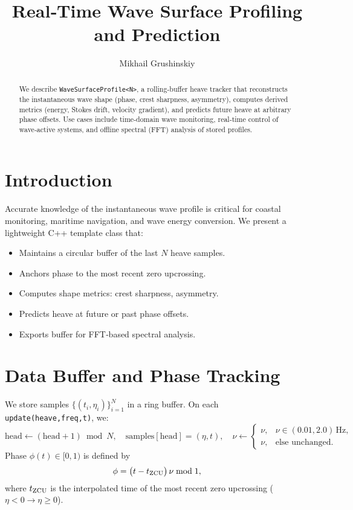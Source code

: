 \documentclass[11pt]{article}
\title{Real‐Time Wave Surface Profiling and Prediction}
\author{Mikhail Grushinskiy}
\affil{Independent Researcher, 2025}
\begin{document}
\maketitle

\begin{abstract}
We describe \texttt{WaveSurfaceProfile<N>}, a rolling‐buffer heave tracker that reconstructs the instantaneous wave shape (phase, crest sharpness, asymmetry), computes derived metrics (energy, Stokes drift, velocity gradient), and predicts future heave at arbitrary phase offsets.  Use cases include time‐domain wave monitoring, real‐time control of wave‐active systems, and offline spectral (FFT) analysis of stored profiles.
\end{abstract}

\section{Introduction}
Accurate knowledge of the instantaneous wave profile is critical for coastal monitoring, maritime navigation, and wave energy conversion.  We present a lightweight C++ template class that:
\begin{itemize}
  \item Maintains a circular buffer of the last \(N\) heave samples.
  \item Anchors phase to the most recent zero upcrossing.
  \item Computes shape metrics: crest sharpness, asymmetry.
  \item Predicts heave at future or past phase offsets.
  \item Exports buffer for FFT‐based spectral analysis.
\end{itemize}

\section{Data Buffer and Phase Tracking}
We store samples \(\{(t_i,\eta_i)\}_{i=1}^N\) in a ring buffer.  On each \texttt{update(heave,freq,t)}, we:
\[
\text{head}\leftarrow(\text{head}+1)\bmod N,\quad 
\text{samples}[\text{head}]=(\eta,t),
\quad \nu\leftarrow\begin{cases}
\nu, & \nu\in(0.01,2.0)\,\text{Hz},\\
\nu, & \text{else unchanged}.
\end{cases}
\]
Phase \(\phi(t)\in[0,1)\) is defined by
\[
\phi=\bigl(t - t_{\rm ZCU}\bigr)\,\nu \bmod 1,
\]
where \(t_{\rm ZCU}\) is the interpolated time of the most recent zero upcrossing (\(\eta<0\to\eta\ge0\)).
\end{document}
